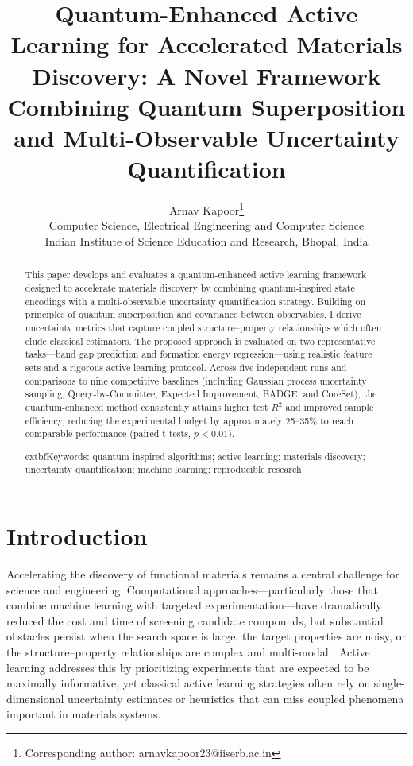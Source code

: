 \documentclass{article}
\title{Quantum-Enhanced Active Learning for Accelerated Materials Discovery: A Novel Framework Combining Quantum Superposition and Multi-Observable Uncertainty Quantification}
\author{
Arnav Kapoor\orcidlink{0009-0007-9818-7908}\thanks{Corresponding author: arnavkapoor23@iiserb.ac.in} \\
Computer Science, Electrical Engineering and Computer Science \\
Indian Institute of Science Education and Research, Bhopal, India
}
\date{}
\begin{document}
\maketitle

\begin{abstract}
This paper develops and evaluates a quantum-enhanced active learning framework designed to accelerate materials discovery by combining quantum-inspired state encodings with a multi-observable uncertainty quantification strategy. Building on principles of quantum superposition and covariance between observables, I derive uncertainty metrics that capture coupled structure–property relationships which often elude classical estimators. The proposed approach is evaluated on two representative tasks—band gap prediction and formation energy regression—using realistic feature sets and a rigorous active learning protocol. Across five independent runs and comparisons to nine competitive baselines (including Gaussian process uncertainty sampling, Query-by-Committee, Expected Improvement, BADGE, and CoreSet), the quantum-enhanced method consistently attains higher test $R^2$ and improved sample efficiency, reducing the experimental budget by approximately 25–35\% to reach comparable performance (paired t-tests, $p<0.01$).

	extbf{Keywords:} quantum-inspired algorithms; active learning; materials discovery; uncertainty quantification; machine learning; reproducible research
\end{abstract}

\section{Introduction}

Accelerating the discovery of functional materials remains a central challenge for science and engineering. Computational approaches—particularly those that combine machine learning with targeted experimentation—have dramatically reduced the cost and time of screening candidate compounds, but substantial obstacles persist when the search space is large, the target properties are noisy, or the structure–property relationships are complex and multi-modal \cite{butler2018machine, lookman2019active}. Active learning addresses this by prioritizing experiments that are expected to be maximally informative, yet classical active learning strategies often rely on single-dimensional uncertainty estimates or heuristics that can miss coupled phenomena important in materials systems.
\end{document}

